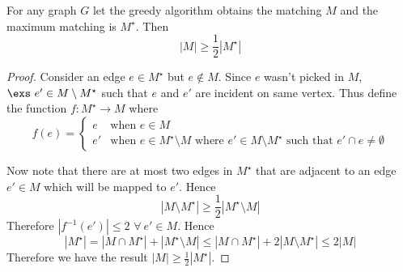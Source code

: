 \begin{Theorem}{}{}
	For any graph $G$ let the greedy algorithm obtains the matching $M$ and the maximum matching is $M^{\star}$. Then $$|M|\geq \frac12|M^\star|$$
\end{Theorem}
\begin{proof}
	Consider an edge $e\in M^{\star}$ but $e\notin M$. Since $e$ wasn't  picked in $M$, $\exs\ e'\in M\setminus M^{\star}$ such that $e$ and $e'$ are incident on same vertex. Thus define the function $f:M^{\star}\to M$ where $$f(e)=\begin{cases}
		e&\text{when $e\in M$}\\
		e' & \text{when $e\in M^{\star}\setminus M$ where $e'\in M\setminus M^{\star}$ such that $e'\cap e\neq \emptyset$}
	\end{cases}$$

Now note that there are at most  two edges in $M^{\star}$ that are adjacent to an edge $e'\in M$ which will be mapped to $e'$. Hence $$|M\setminus M^{\star}|\geq \frac12 |M^{\star}\setminus M|$$Therefore $|f^{-1}(e')|\leq 2$ $\forall\ e'\in M$. Hence $$|M^\star|=|M\cap M^{\star}|+|M^{\star}\setminus M|\leq |M\cap M^{\star}|+2|M\setminus M^{\star}|\leq 2|M|$$Therefore we have the result $|M|\geq \frac12|M^{\star}|$. 
\end{proof}
